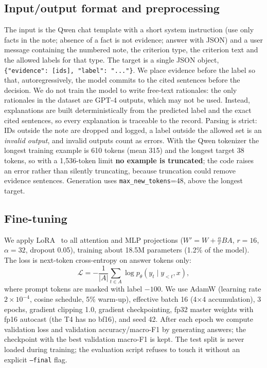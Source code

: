 \documentclass[conference]{IEEEtran}
\begin{document}
\subsection{Input/output format and preprocessing}
The input is the Qwen chat template with a short system instruction (use only facts in the note; absence of a fact is not evidence; answer with JSON) and a user message containing the numbered note, the criterion type, the criterion text and the allowed labels for that type. The target is a single JSON object, \texttt{\{"evidence": [ids], "label": "..."\}}. We place evidence before the label so that, autoregressively, the model commits to the cited sentences before the decision. We do not train the model to write free-text rationales: the only rationales in the dataset are GPT-4 outputs, which may not be used. Instead, explanations are built deterministically from the predicted label and the exact cited sentences, so every explanation is traceable to the record. Parsing is strict: IDs outside the note are dropped and logged, a label outside the allowed set is an \emph{invalid output}, and invalid outputs count as errors. With the Qwen tokenizer the longest training example is 610 tokens (mean 315) and the longest target 38 tokens, so with a 1{,}536-token limit \textbf{no example is truncated}; the code raises an error rather than silently truncating, because truncation could remove evidence sentences. Generation uses \texttt{max\_new\_tokens}=48, above the longest target.

\subsection{Fine-tuning}
We apply LoRA~\cite{hu2022lora} to all attention and MLP projections ($W' = W + \frac{\alpha}{r}BA$, $r{=}16$, $\alpha{=}32$, dropout 0.05), training about 18.5M parameters (1.2\% of the model). The loss is next-token cross-entropy on answer tokens only:
\begin{equation}
\mathcal{L} = -\frac{1}{|A|}\sum_{t\in A}\log p_\theta(y_t\mid y_{<t}, x),
\end{equation}
where prompt tokens are masked with label $-100$. We use AdamW (learning rate $2\times10^{-4}$, cosine schedule, 5\% warm-up), effective batch 16 (4$\times$4 accumulation), 3 epochs, gradient clipping 1.0, gradient checkpointing, fp32 master weights with fp16 autocast (the T4 has no bf16), and seed 42. After each epoch we compute validation loss and validation accuracy/macro-F1 by generating answers; the checkpoint with the best validation macro-F1 is kept. The test split is never loaded during training; the evaluation script refuses to touch it without an explicit \texttt{--final} flag.
\end{document}
